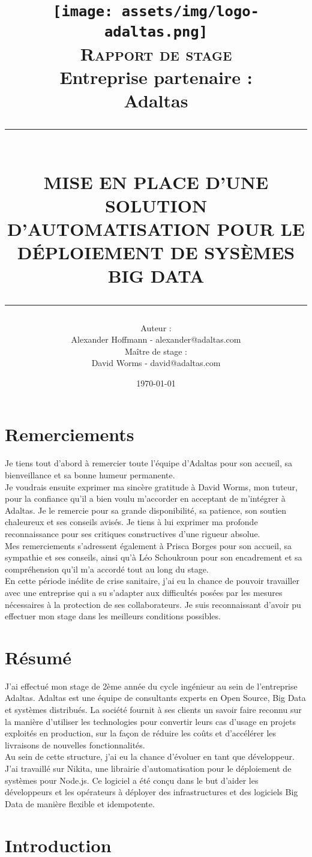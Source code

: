 \documentclass[12pt, french]{report}
\title{	\texttt{[image: assets/img/logo-adaltas.png]}\\[1 cm]
		\normalsize \textsc{Rapport de stage}\\[0.8cm]
		{Entreprise partenaire : \\Adaltas}\\[0.8 cm]
		\rule{\linewidth}{0.2 mm} \\[0.4 cm]
		\LARGE \textbf{\uppercase{Mise en place d'une solution d'automatisation pour le déploiement de sysèmes Big Data}}
		\rule{\linewidth}{0.2 mm}
		}
\author {\normalsize Auteur :\\	\normalsize Alexander Hoffmann - alexander@adaltas.com\\[0.5 cm]
		 \normalsize Maître de stage :\\	\normalsize David Worms - david@adaltas.com\\}
\date{\normalsize \today}
\begin{document}


\maketitle

\chapter*{Remerciements}

Je tiens tout d’abord à remercier toute l'équipe d'Adaltas pour son accueil, sa bienveillance et sa bonne
humeur permanente.\\

Je voudrais ensuite exprimer ma sincère gratitude à David Worms, mon tuteur, pour la confiance qu’il a bien voulu m’accorder en acceptant de m'intégrer à Adaltas. Je le remercie pour sa grande disponibilité, sa patience, son soutien chaleureux et ses conseils avisés. Je tiens à lui exprimer ma profonde reconnaissance pour ses critiques constructives d’une rigueur absolue.\\

Mes remerciements s’adressent également à Prisca Borges pour son accueil, sa sympathie et ses conseils, ainsi qu'à Léo Schoukroun pour son encadrement et sa compréhension qu'il m'a accordé tout au long du stage.\\

En cette période inédite de crise sanitaire, j'ai eu la chance de pouvoir travailler avec une entreprise qui a su s'adapter aux difficultés posées par les mesures nécessaires à la protection de ses collaborateurs. Je suis reconnaissant d'avoir pu effectuer mon stage dans les meilleurs conditions possibles.

\chapter*{Résumé}

J'ai effectué mon stage de 2ème année du cycle ingénieur au sein de l'entreprise Adaltas. Adaltas est une équipe de consultants experts en Open Source, Big Data et systèmes distribués. La société fournit à ses clients un savoir faire reconnu sur la manière d'utiliser les technologies pour convertir leurs cas d'usage en projets exploités en production, sur la façon de réduire les coûts et d'accélérer les livraisons de nouvelles fonctionnalités.\\

Au sein de cette structure, j'ai eu la chance d'évoluer en tant que développeur. J'ai travaillé sur Nikita, une librairie d’automatisation pour le déploiement de systèmes pour Node.js. Ce logiciel a été conçu dans le but d'aider les développeurs et les opérateurs à déployer des infrastructures et des logiciels Big Data de manière flexible et idempotente.\\

\begingroup
\hypersetup{linkcolor=black}
\tableofcontents
\listoffigures
\newpage
\endgroup

\chapter*{Introduction}
\end{document}

